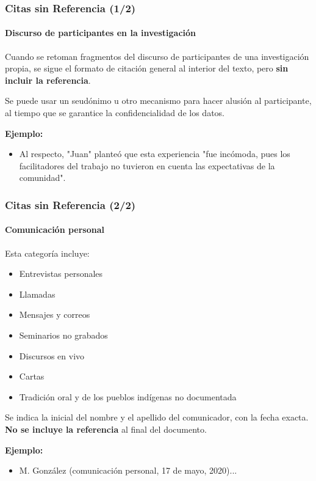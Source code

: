 \documentclass[aspectratio=169]{beamer}
\begin{document}
\begin{frame}
	\frametitle{Citas sin Referencia (1/2)}
	\framesubtitle{Discurso de participantes en la investigación}
	
	Cuando se retoman fragmentos del discurso de participantes de una investigación propia, se sigue el formato de citación general al interior del texto, pero \textbf{sin incluir la referencia}.
	
	\vspace{1em}
	
	Se puede usar un seudónimo u otro mecanismo para hacer alusión al participante, al tiempo que se garantice la confidencialidad de los datos.
	
	\vspace{1em}
	
	\textbf{Ejemplo:}
	\begin{itemize}
		\item Al respecto, "Juan" planteó que esta experiencia "fue incómoda, pues los facilitadores del trabajo no tuvieron en cuenta las expectativas de la comunidad".
	\end{itemize}
\end{frame}

\begin{frame}
	\frametitle{Citas sin Referencia (2/2)}
	\framesubtitle{Comunicación personal}
	
	Esta categoría incluye:
	\begin{itemize}
		\item Entrevistas personales
		\item Llamadas
		\item Mensajes y correos
		\item Seminarios no grabados
		\item Discursos en vivo
		\item Cartas
		\item Tradición oral y de los pueblos indígenas no documentada
	\end{itemize}
	
	\vspace{1em}
	
	Se indica la inicial del nombre y el apellido del comunicador, con la fecha exacta. \textbf{No se incluye la referencia} al final del documento.
	
	\vspace{1em}
	
	\textbf{Ejemplo:}
	\begin{itemize}
		\item M. González (comunicación personal, 17 de mayo, 2020)...
	\end{itemize}
\end{frame}
\end{document}
